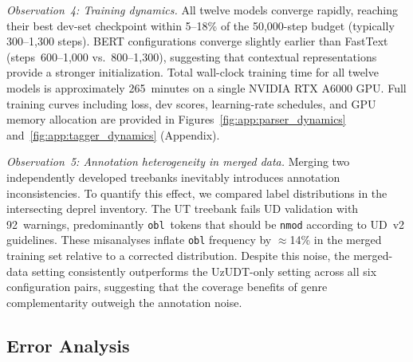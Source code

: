 \documentclass[runningheads]{llncs}
\begin{document}
\textit{Observation~4: Training dynamics.}
All twelve models converge rapidly, reaching their best dev-set checkpoint within 5--18\% of the 50{,}000-step budget (typically 300--1{,}300 steps).
BERT configurations converge slightly earlier than FastText (steps~600--1{,}000 vs.\ 800--1{,}300), suggesting that contextual representations provide a stronger initialization.
Total wall-clock training time for all twelve models is approximately 265~minutes on a single NVIDIA RTX A6000 GPU.
Full training curves including loss, dev scores, learning-rate schedules, and GPU memory allocation are provided in Figures~\ref{fig:app:parser_dynamics} and~\ref{fig:app:tagger_dynamics} (Appendix).

\textit{Observation~5: Annotation heterogeneity in merged data.}
Merging two independently developed treebanks inevitably introduces annotation inconsistencies.
To quantify this effect, we compared label distributions in the intersecting deprel inventory.
The UT treebank fails UD validation with 92~warnings, predominantly \texttt{obl}~tokens that should be \texttt{nmod} according to UD~v2 guidelines.
These misanalyses inflate \texttt{obl} frequency by ${\approx}$14\% in the merged training set relative to a corrected distribution.
Despite this noise, the merged-data setting consistently outperforms the UzUDT-only setting across all six configuration pairs, suggesting that the coverage benefits of genre complementarity outweigh the annotation noise.

\subsection{Error Analysis}
\label{sec:error_analysis}
\end{document}
